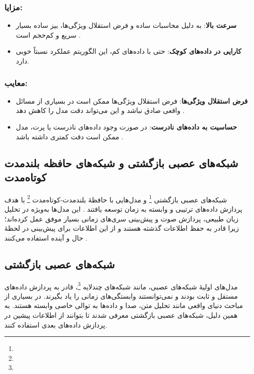 \subsubsection{مزایا:}
\begin{itemize}
	\item \textbf{سرعت بالا}: به دلیل محاسبات ساده و فرض استقلال ویژگی‌ها، بیز ساده بسیار سریع و کم‌حجم است
	\cite{mccallum1998comparison}.
	\item \textbf{کارایی در داده‌های کوچک}: حتی با داده‌های کم، این الگوریتم عملکرد نسبتاً خوبی دارد\cite{murphy2012machine}.
\end{itemize} 	

\subsubsection{معایب:}
\begin{itemize}
	\item \textbf{فرض استقلال ویژگی‌ها}: فرض استقلال ویژگی‌ها ممکن است در بسیاری از مسائل واقعی صادق نباشد و این می‌تواند دقت مدل را کاهش دهد
	\cite{domingos1997optimal}.
	\item \textbf{حساسیت به داده‌های نادرست}: در صورت وجود داده‌های نادرست یا پرت، مدل ممکن است دقت کمتری داشته باشد
	\cite{bishop2006pattern}.
\end{itemize}


\subsection{شبکه‌های عصبی بازگشتی و شبکه‌های حافظه بلندمدت کوتاه‌مدت}
شبکه‌های عصبی بازگشتی \footnote{} و مدل‌هایی با حافظهٔ بلندمدت-کوتاه‌مدت \footnote{} با هدف پردازش داده‌های ترتیبی و وابسته به زمان توسعه یافتند
\cite{rumelhart1986learning,hochreiter1997long}.
این مدل‌ها به‌ویژه در تحلیل زبان طبیعی، پردازش صوت و پیش‌بینی سری‌های زمانی بسیار موفق عمل کرده‌اند؛ زیرا قادر به حفظ اطلاعات گذشته هستند و از این اطلاعات برای پیش‌بینی در لحظهٔ حال و آینده استفاده می‌کنند
\cite{gers1999learning}.

\subsection{شبکه‌های عصبی بازگشتی}
مدل‌های اولیهٔ شبکه‌های عصبی، مانند شبکه‌های چندلایه \footnote{}، قادر به پردازش داده‌های مستقل و ثابت بودند و نمی‌توانستند وابستگی‌های زمانی را یاد بگیرند\cite{bishop2006pattern}.
در بسیاری از مباحث دنیای واقعی مانند تحلیل متن، صدا و  داده‌ها به توالی خاصی وابسته هستند. به همین دلیل، شبکه‌های عصبی بازگشتی معرفی شدند تا بتوانند از اطلاعات پیشین در پردازش داده‌های بعدی استفاده کنند\cite{rumelhart1986learning}.


